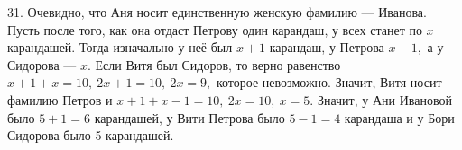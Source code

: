 31. Очевидно, что Аня носит единственную женскую фамилию --- Иванова. Пусть после того, как она отдаст Петрову один карандаш, у всех станет по $x$ карандашей. Тогда изначально у неё был $x+1$ карандаш, у Петрова $x-1,$ а у Сидорова --- $x.$ Если Витя был Сидоров, то верно равенство $x+1+x=10,\ 2x+1=10,\ 2x=9,$ которое невозможно. Значит, Витя носит фамилию Петров и $x+1+x-1=10,\ 2x=10,\ x=5.$ Значит, у Ани Ивановой было $5+1=6$ карандашей, у Вити Петрова было $5-1=4$ карандаша и у Бори Сидорова было 5 карандашей.\\
